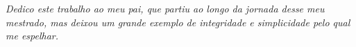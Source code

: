 \begin{dedicatoria}
   \vspace*{\fill}
   \textit{
      Dedico este trabalho ao meu pai, que partiu ao longo da jornada desse meu mestrado, mas deixou um grande exemplo de integridade e simplicidade pelo qual me espelhar.
   }
\end{dedicatoria}
